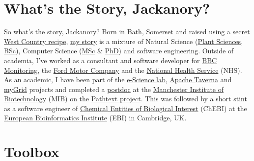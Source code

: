 \documentclass[
  12pt,
]{book}
\begin{document}
\section*{What's the Story, Jackanory?}\label{whats-the-story-jackanory}

So what's the story, \href{https://en.wikipedia.org/wiki/Jackanory}{Jackanory}? Born in \href{https://en.wikipedia.org/wiki/Bath,_Somerset}{Bath, Somerset} and raised using a \href{https://en.wikipedia.org/wiki/West_Country}{secret West Country recipe}, \href{https://uk.linkedin.com/in/duncanhull}{my story} is a mixture of Natural Science (\href{https://duncan.hull.name/2026/07/04/graduation/}{Plant Sciences, BSc}), Computer Science (\href{mastersofscience.html}{MSc} \& \href{https://www.librarysearch.manchester.ac.uk/permalink/44MAN_INST/1r887gn/alma992976677936301631}{PhD}) and software engineering. Outside of academia, I've worked as a consultant and software developer for \href{https://en.wikipedia.org/wiki/BBC_Monitoring}{BBC Monitoring}, the \href{https://en.wikipedia.org/wiki/Ford_Motor_Company}{Ford Motor Company} and the \href{https://en.wikipedia.org/wiki/National_Health_Service}{National Health Service} (NHS). As an academic, I have been part of the \href{https://esciencelab.org.uk/}{e-Science lab}, \href{https://en.wikipedia.org/wiki/Apache_Taverna}{Apache Taverna} and \href{https://en.wikipedia.org/wiki/MyGrid}{myGrid} projects and completed a \href{https://en.wikipedia.org/wiki/Postdoctoral_researcher}{postdoc} at the \href{https://www.mib.manchester.ac.uk/}{Manchester Institute of Biotechnology} (MIB) on the \href{https://pubmed.ncbi.nlm.nih.gov/20529930/}{Pathtext project}. This was followed by a short stint as a software engineer of \href{https://en.wikipedia.org/wiki/ChEBI}{Chemical Entities of Biological Interest} (ChEBI) at the \href{https://en.wikipedia.org/wiki/European_Bioinformatics_Institute}{European Bioinformatics Institute} (EBI) in Cambridge, UK. 🧬👨‍🔬

\section*{Toolbox}\label{toolbox}
\end{document}
